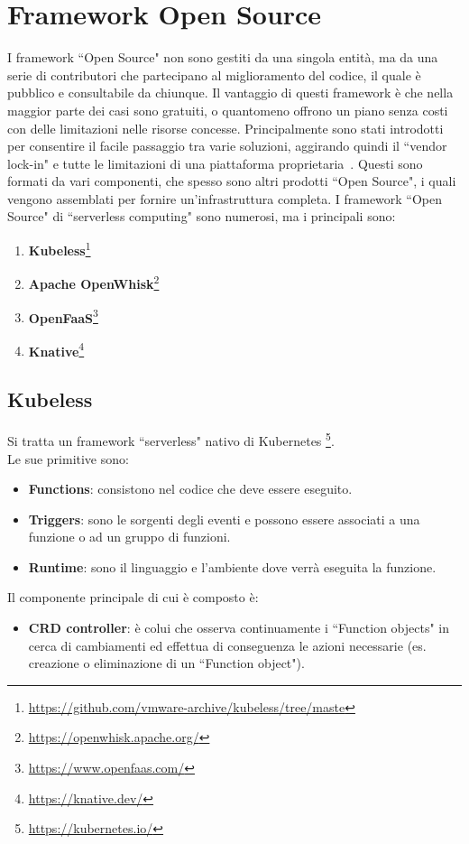 \documentclass[12pt,a4paper,openany,twoside]{book}
\begin{document}
\section{Framework Open Source}

I framework ``Open Source" non sono gestiti da una singola entità, ma da una serie di contributori che partecipano al miglioramento del codice, il quale è pubblico e consultabile da chiunque. Il vantaggio di questi framework è che nella maggior parte dei casi sono gratuiti, o quantomeno offrono un piano senza costi con delle limitazioni nelle risorse concesse. Principalmente sono stati introdotti per consentire il facile passaggio tra varie soluzioni, aggirando quindi il ``vendor lock-in" e tutte le limitazioni di una piattaforma proprietaria~\cite{Yussupov2021}. Questi sono formati da vari componenti, che spesso sono altri prodotti ``Open Source", i quali vengono assemblati per fornire un'infrastruttura completa.
I framework ``Open Source" di ``serverless computing" sono numerosi, ma i principali sono:
\begin{enumerate}
    \item \textbf{Kubeless}\footnote{\url{https://github.com/vmware-archive/kubeless/tree/maste}}
    
    \item \textbf{Apache OpenWhisk}\footnote{\url{https://openwhisk.apache.org/}}
    
    \item \textbf{OpenFaaS}\footnote{\url{https://www.openfaas.com/}}
    
    \item \textbf{Knative}\footnote{\url{https://knative.dev/}}
\end{enumerate}

\subsection{Kubeless}

Si tratta un framework ``serverless" nativo di Kubernetes \footnote{\url{https://kubernetes.io/}}.
\\
Le sue primitive sono:
\begin{itemize}
    \item \textbf{Functions}: consistono nel codice che deve essere eseguito.
    
    \item \textbf{Triggers}: sono le sorgenti degli eventi e possono essere associati a una funzione o ad un gruppo di funzioni.
    
    \item \textbf{Runtime}: sono il linguaggio e l'ambiente dove verrà eseguita la funzione.
\end{itemize}
Il componente principale di cui è composto è:
\begin{itemize}
    \item \textbf{CRD controller}: è colui che osserva continuamente i ``Function objects" in cerca di cambiamenti ed effettua di conseguenza le azioni necessarie (es. creazione o eliminazione di un ``Function object").
\end{itemize}
\end{document}
